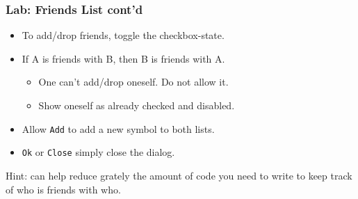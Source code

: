 \begin{slide}
\frametitle{Lab: Friends List cont'd}
\begin{itemize}
\item  To add/drop friends, toggle the checkbox-state.
\item  If A is friends with B, then B is friends with A.
\begin{itemize}
\item  One can't add/drop oneself. Do not allow it. 
\item Show oneself as already checked and disabled.
\end{itemize}
\item  Allow \texttt{Add} to add a new symbol to both lists.
\item  \texttt{Ok} or \texttt{Close} simply close the dialog. 
\end{itemize}
Hint:  can help reduce grately the amount of code you need to write to keep track of who is friends with who.
\end{slide}


